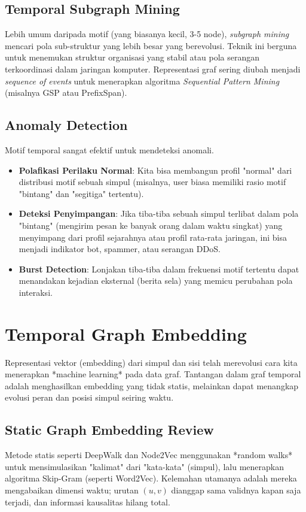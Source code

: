 \documentclass[12pt,a4paper]{book}
\begin{document}
\section{Temporal Subgraph Mining}
Lebih umum daripada motif (yang biasanya kecil, 3-5 node), \textit{subgraph mining} mencari pola sub-struktur yang lebih besar yang berevolusi.
Teknik ini berguna untuk menemukan struktur organisasi yang stabil atau pola serangan terkoordinasi dalam jaringan komputer. Representasi graf sering diubah menjadi \textit{sequence of events} untuk menerapkan algoritma \textit{Sequential Pattern Mining} (misalnya GSP atau PrefixSpan).

\section{Anomaly Detection}
Motif temporal sangat efektif untuk mendeteksi anomali.
\begin{itemize}
    \item \textbf{Polafikasi Perilaku Normal}: Kita bisa membangun profil "normal" dari distribusi motif sebuah simpul (misalnya, user biasa memiliki rasio motif "bintang" dan "segitiga" tertentu).
    \item \textbf{Deteksi Penyimpangan}: Jika tiba-tiba sebuah simpul terlibat dalam pola "bintang" (mengirim pesan ke banyak orang dalam waktu singkat) yang menyimpang dari profil sejarahnya atau profil rata-rata jaringan, ini bisa menjadi indikator bot, spammer, atau serangan DDoS.
    \item \textbf{Burst Detection}: Lonjakan tiba-tiba dalam frekuensi motif tertentu dapat menandakan kejadian eksternal (berita sela) yang memicu perubahan pola interaksi.
\end{itemize}

\chapter{Temporal Graph Embedding}
Representasi vektor (embedding) dari simpul dan sisi telah merevolusi cara kita menerapkan *machine learning* pada data graf. Tantangan dalam graf temporal adalah menghasilkan embedding yang tidak statis, melainkan dapat menangkap evolusi peran dan posisi simpul seiring waktu.

\section{Static Graph Embedding Review}
Metode statis seperti DeepWalk dan Node2Vec menggunakan *random walks* untuk mensimulasikan "kalimat" dari "kata-kata" (simpul), lalu menerapkan algoritma Skip-Gram (seperti Word2Vec). Kelemahan utamanya adalah mereka mengabaikan dimensi waktu; urutan $(u, v)$ dianggap sama validnya kapan saja terjadi, dan informasi kausalitas hilang total.
\end{document}
